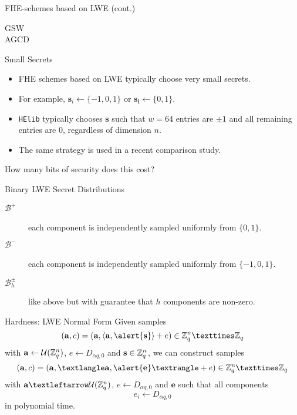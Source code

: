 \documentclass[presentation,smaller]{beamer}
\newcommand{\ZZq}[1][blank]{\ensuremath{\ifthenelse{\equal{#1}{blank}}{\mathbb{Z}_q}{\mathbb{Z}_q\left[#1\right]}\xspace}}
\renewcommand{\vec}[1]{\ensuremath{\mathbf{#1}}\xspace}
\renewcommand{\B}[2][]{\ensuremath{\mathcal{B}_{#1}^{#2}}\xspace}
\begin{document}
\begin{frame}[label={sec:org0e19838}]{FHE-schemes based on LWE (cont.)}
\footnotesize

\begin{description}
\item[{GSW}] 

\item[{AGCD}] 
\end{description}
\end{frame}

\begin{frame}[fragile,label={sec:orga8953a8}]{Small Secrets}
 \begin{itemize}
\item FHE schemes based on LWE typically choose very small secrets.
\item For example, \(\vec{s}_{i} ← \{-1,0,1\}\) or \(\vec{s_{i}} ← \{0,1\}\).
\item \texttt{HElib}  typically chooses \(\vec{s}\) such that \(w=64\) entries are \(±1\) and all remaining entries are \(0\), regardless of dimension \(n\).
\item The same strategy is used in a recent comparison study.
\end{itemize}

\begin{center}
\alert{How many bits of security does this cost?}
\end{center}
\end{frame}

\begin{frame}[label={sec:orga18e80f}]{Binary LWE Secret Distributions}
\begin{description}
\item[{\(\B{+}\)}] each component is independently sampled uniformly from \(\{0,1\}\).
\item[{\(\B{-}\)}] each component is independently sampled uniformly from \(\{-1,0,1\}\).
\item[{\(\B[h]{±}\)}] like above but with guarantee that \(h\) components are non-zero.
\end{description}
\end{frame}

\begin{frame}[label={sec:org5ac6443}]{Hardness: LWE Normal Form}
Given samples
\[(\vec{a},c)=(\vec{a},\langle\vec{a},\alert{\vec{s}}\rangle+ e) \in \ZZq^n × \ZZq\]
with \(\vec{a} \gets \mathcal{U}(\ZZq^n)\), \(e \gets D_{α q,0}\) and \(\vec{s} \in \ZZq^n\),
we can construct samples
\[(\vec{a}, c)=(\vec{a},⟨\vec{a},\alert{\vec{e}}⟩+ e) \in \ZZq^n × \ZZq\] with
\(\vec{a} ← \mathcal{U}(\ZZq^n)\), \(e ← D_{α q, 0}\) and \alert{\(\vec{e}\)} such that all components \alert{\[e_i ← D_{α q, 0}\]} in polynomial time.
\end{frame}
\end{document}
